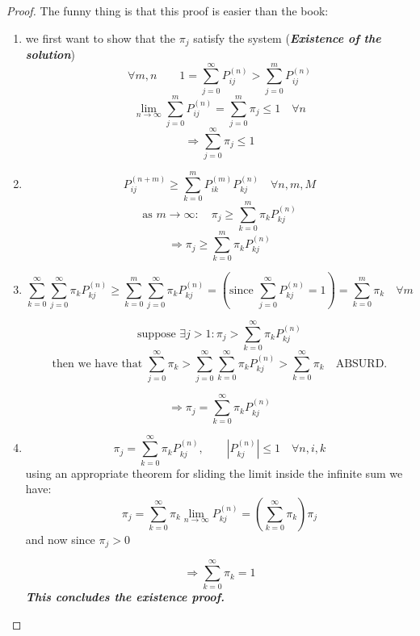 	\begin{proof} The funny thing is that this proof is easier than the book:
		\begin{enumerate}
			\item
			we first want to show that the $\pi_j$ satisfy the system (\textbf{\textit{Existence of the solution}})
			$$ \forall m,n \qquad 1=\sum_{j=0}^\infty P_{ij}^{(n)} > \sum_{j=0}^m P_{ij}^{(n)}$$
			$$ \lim_{n\to\infty} \sum_{j=0}^m P_{ij}^{(n)} = \sum_{j=0}^m \pi_j \leq 1 \quad \forall n $$
			\begin{equation}
				\Rightarrow \sum_{j=0}^\infty \pi_j \leq 1
			\end{equation}

			\item
			$$P_{ij}^{(n+m)} \geq \sum_{k=0}^m P_{ik}^{(m)} P_{kj}^{(n)} \quad \forall n, m, M$$
			$$ \mbox{as } m \to \infty :\quad \pi_j \geq \sum_{k=0}^m \pi_k P_{kj}^{(n)} $$
			\begin{equation}
				\Rightarrow  \pi_j \geq \sum_{k=0}^m \pi_k P_{kj}^{(n)}
			\end{equation}

			\item
			$$\sum_{k=0}^\infty \sum_{j=0}^\infty \pi_k P_{kj}^{(n)} \geq
			\sum_{k=0}^m \sum_{j=0}^\infty \pi_k P_{kj}^{(n)}  =
			(\mbox{since } \sum_{j=0}^\infty P_{kj}^{(n)} = 1 ) =
			\sum_{k=0}^m \pi_k \quad \forall m $$

			$$ \mbox{suppose } \exists j > 1 : \pi_j > \sum_{k=0}^\infty \pi_k P_{kj}^{(n)} $$
			$$ \mbox{then we have that } \sum_{j=0}^\infty \pi_k > \sum_{j=0}^\infty \sum_{k=0}^\infty \pi_k P_{kj}^{(n)} > \sum_{k=0}^\infty \pi_k \quad \mbox{ABSURD.} $$

			\begin{equation}
				\Rightarrow \pi_j = \sum_{k=0}^\infty \pi_k P_{kj}^{(n)}
			\end{equation}

			\item
			$$ \pi_j = \sum_{k=0}^\infty \pi_k P_{kj}^{(n)}, \qquad |P_{kj}^{(n)}| \leq 1 \quad \forall n,i,k $$
			using an appropriate theorem for sliding the limit inside the infinite sum we have:
			$$\pi_j = \sum_{k=0}^\infty  \pi_k \lim_{n\to\infty} P_{kj}^{(n)} = (\sum_{k=0}^\infty \pi_k) \pi_j$$
			and now since $\pi_j>0$

			\begin{equation}
				\Rightarrow \sum_{k=0}^\infty \pi_k = 1
			\end{equation}
			\textbf{\textit{This concludes the existence proof.}}


\end{enumerate}
\end{proof}
